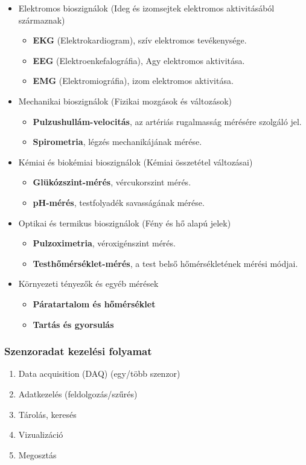 \begin{itemize}
    \item Elektromos bioszignálok (Ideg és izomsejtek elektromos aktivitásából származnak)
    \begin{itemize}
        \item \textbf{EKG} (Elektrokardiogram), szív elektromos tevékenysége.
        \item \textbf{EEG} (Elektroenkefalográfia), Agy elektromos aktivitása.
        \item \textbf{EMG} (Elektromiográfia), izom elektromos aktivitása.
    \end{itemize}
    \item Mechanikai bioszignálok (Fizikai mozgások és változások)
    \begin{itemize}
        \item \textbf{Pulzushullám-velocitás}, az artériás rugalmasság mérésére szolgáló jel.
        \item \textbf{Spirometria}, légzés mechanikájának mérése.
    \end{itemize}
    \item Kémiai és biokémiai bioszignálok (Kémiai összetétel változásai)
    \begin{itemize}
        \item \textbf{Glükózszint-mérés}, vércukorszint mérés.
        \item \textbf{pH-mérés}, testfolyadék savasságának mérése.
    \end{itemize}
    \item Optikai és termikus bioszignálok (Fény és hő alapú jelek)
    \begin{itemize}
        \item \textbf{Pulzoximetria}, véroxigénszint mérés.
        \item \textbf{Testhőmérséklet-mérés}, a test belső hőmérsékletének mérési módjai.
    \end{itemize}
    \item Környezeti tényezők és egyéb mérések
    \begin{itemize}
        \item \textbf{Páratartalom és hőmérséklet}
        \item \textbf{Tartás és gyorsulás}
    \end{itemize}
\end{itemize}

\subsubsection{Szenzoradat kezelési folyamat}
\begin{enumerate}
    \item Data acquisition (DAQ) (egy/több szenzor)
    \item Adatkezelés (feldolgozás/szűrés)
    \item Tárolás, keresés
    \item Vizualizáció
    \item Megosztás
\end{enumerate}

